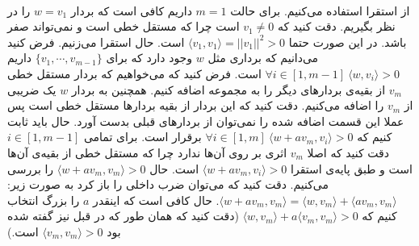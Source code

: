 \\
از استقرا استفاده می‌کنیم. برای حالت
$m=1$
داریم کافی است که بردار
$w = v_1$
را در نظر بگیریم. دقت کنید که
$v_1 \neq 0$
است چرا که مستقل خطی است و نمی‌تواند صفر باشد.
در این صورت حتما
$\langle v_1, v_1 \rangle = ||v_1||^2 > 0$
است.
حال استقرا می‌زنیم. فرض کنید می‌دانیم که برداری مثل
$w$
وجود دارد که برای
$\lbrace v_1, \cdots, v_{m-1} \rbrace$
داریم
$\forall i \in [1, m-1] ~ \langle w, v_i \rangle > 0$
است.
فرض کنید که می‌خواهیم که بردار مستقل خطی
$v_m$
از بقیه‌ی بردار‌های دیگر را به مجموعه اضافه کنیم.
همچنین به بردار
$w$
یک ضریبی از
$v_m$
را اضافه می‌کنیم. دقت کنید که این بردار از بقیه بردار‌ها مستقل خطی است پس عملا این قسمت اضافه شده را نمی‌توان
از بردار‌های قبلی بدست آورد.
حال باید ثابت کنیم که
$\forall i \in [1, m] ~ \langle w + av_m, v_i \rangle > 0$
برقرار است.
برای تمامی
$i \in [1, m-1]$
دقت کنید که اصلا
$v_m$
اثری بر روی آن‌ها ندارد چرا که مستقل خطی از بقیه‌ی آن‌ها است و طبق پایه‌ی استقرا
$\langle w + av_m, v_i \rangle > 0$
است. حال
$\langle w + av_m, v_m \rangle > 0$
را بررسی می‌کنیم.
دقت کنید که می‌توان ضرب داخلی را باز کرد به صورت زیر:
$\langle w + av_m, v_m \rangle = \langle w, v_m \rangle + \langle av_m, v_m \rangle$.
حال کافی است که اینقدر
$a$
را بزرگ انتخاب کنیم که
$\langle w, v_m \rangle + a\langle v_m, v_m \rangle > 0$
(دقت کنید که همان طور که در قبل نیز گفته شده بود
$\langle v_m, v_m \rangle > 0$
است.)

